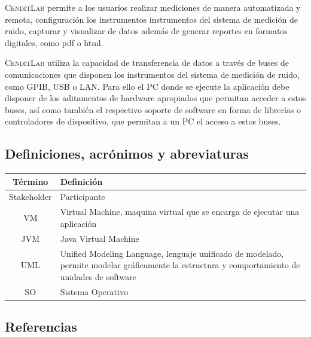 \documentclass[paper=a4,oneside,fontsize=12pt]{article}
\newcommand{\AppName}{\textsc{CenditLab}\xspace}
\newcommand{\smr}{sistema de medición de ruido}
\begin{document}
	\AppName permite a los usuarios realizar mediciones de manera automatizada y remota, configuración los instrumentos instrumentos del \smr, capturar y visualizar de datos además de generar reportes en formatos digitales, como pdf o html.
	
	\AppName utiliza la capacidad de transferencia de datos a través de buses de comunicaciones que disponen los instrumentos del \smr, como GPIB, USB o LAN. Para ello el PC donde se ejecute la aplicación debe disponer de los aditamentos de hardware apropiados que permitan acceder a estos buses, así como también el respectivo soporte de software en forma de librerías o controladores de dispositivo, que permitan a un PC el acceso a estos buses.
	
	\subsection{Definiciones, acrónimos y abreviaturas}
	
	\begin{table}[h!]
		\begin{tabularx}{\textwidth}{|c|X|} 
			\hline
			\textbf{Término} & \textbf{Definición} \\
			\hline
			Stakeholder & Participante \\
			\hline
			VM	& Virtual Machine, maquina virtual que se encarga de ejecutar una aplicación \\
			\hline
			JVM & Java Virtual Machine \\
			\hline
			UML & Unified Modeling Language, lenguaje unificado de modelado, permite modelar gráficamente la estructura y comportamiento de unidades de software \\
			\hline
			SO & Sistema Operativo \\
			\hline
		\end{tabularx}	
	\end{table}

	\subsection{Referencias}
	
	
\end{document}
